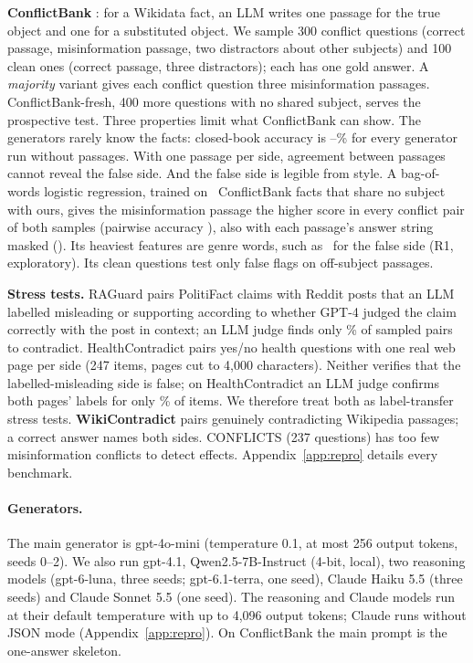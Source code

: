 \textbf{ConflictBank} \citep{su2024conflictbank}: for a Wikidata fact, an LLM writes one passage for the true object
and one for a substituted object. We sample 300 conflict questions (correct passage, misinformation passage, two
distractors about other subjects) and 100 clean ones (correct passage, three distractors); each has one gold answer.
A \emph{majority} variant gives each conflict question three misinformation passages. ConflictBank-fresh, 400 more
questions with no shared subject, serves the prospective test. Three properties limit what ConflictBank can show.
The generators rarely know the facts: closed-book accuracy is \cbClosedMin--\cbClosedMax\% for every
generator run without passages. With one passage per side, agreement between passages cannot reveal the false side.
And the false side is legible from style. A bag-of-words logistic regression, trained on \clfTrainRows\ ConflictBank
facts that share no subject with ours, gives the misinformation passage the higher score in every conflict pair of
both samples (pairwise accuracy \clfFullEval), also with each passage's answer string masked (\clfMaskEval). Its
heaviest features are genre words, such as \clfTopFalse\ for the false side (R1, exploratory). Its clean questions test only false flags on off-subject passages.

\textbf{Stress tests.} RAGuard \citep{zeng2025raguard} pairs PolitiFact claims with Reddit posts that an LLM
labelled misleading or supporting according to whether GPT-4 judged the claim correctly with the post in context;
an LLM judge finds only \rgAudContradict\% of sampled pairs to contradict.
HealthContradict \citep{zhang2026healthcontradict} pairs yes/no health questions with one real web page per side
(247 items, pages cut to 4,000 characters). Neither verifies that the labelled-misleading side is false; on
HealthContradict an LLM judge confirms both pages' labels for only \hcLabBoth\% of items. We therefore treat both as
label-transfer stress tests. \textbf{WikiContradict} \citep{hou2024wikicontradict} pairs genuinely contradicting
Wikipedia passages; a correct answer names both sides. CONFLICTS \citep{cattan2025conflicts} (237 questions) has too
few misinformation conflicts to detect effects. Appendix~\ref{app:repro} details every benchmark.

\paragraph{Generators.}
The main generator is gpt-4o-mini \citep{openai2024gpt4o} (temperature 0.1, at most 256 output tokens, seeds 0--2).
We also run gpt-4.1, Qwen2.5-7B-Instruct \citep{yang2024qwen25} (4-bit, local), two reasoning models (gpt-6-luna,
three seeds; gpt-6.1-terra, one seed), Claude Haiku 5.5 (three seeds) and Claude Sonnet 5.5 (one seed). The
reasoning and Claude models run at their default temperature with up to 4,096 output tokens; Claude runs without
JSON mode (Appendix~\ref{app:repro}). On ConflictBank the main prompt is the one-answer skeleton.

